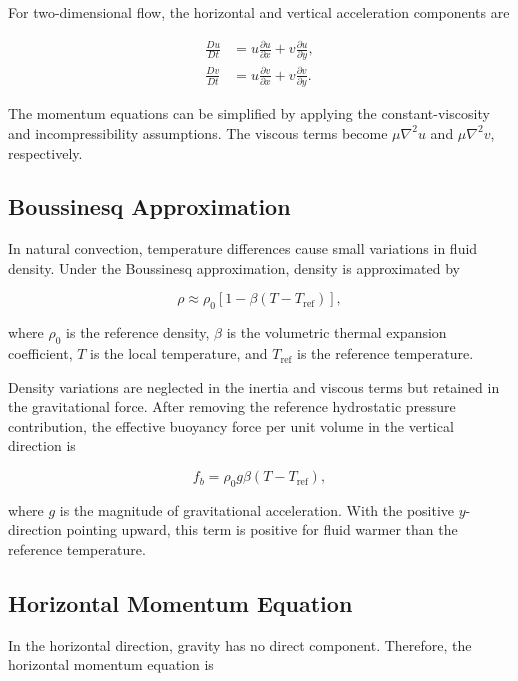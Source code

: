 \documentclass[preprint,3p,number]{elsarticle}
\begin{document}
For two-dimensional flow, the horizontal and vertical
acceleration components are

\begin{align}
\frac{Du}{Dt}
&=u\frac{\partial u}{\partial x}
+v\frac{\partial u}{\partial y},
\\
\frac{Dv}{Dt}
&=u\frac{\partial v}{\partial x}
+v\frac{\partial v}{\partial y}.
\end{align}

The momentum equations can be simplified by applying the
constant-viscosity and incompressibility assumptions. The
viscous terms become $\mu\nabla^2u$ and $\mu\nabla^2v$,
respectively.

\subsection{Boussinesq Approximation}

In natural convection, temperature differences cause small
variations in fluid density. Under the Boussinesq approximation,
density is approximated by

\begin{equation}
\rho\approx\rho_0
\left[1-\beta(T-T_{\mathrm{ref}})\right],
\label{eq:density}
\end{equation}

where $\rho_0$ is the reference density, $\beta$ is the
volumetric thermal expansion coefficient, $T$ is the local
temperature, and $T_{\mathrm{ref}}$ is the reference
temperature.

Density variations are neglected in the inertia and viscous
terms but retained in the gravitational force. After removing
the reference hydrostatic pressure contribution, the effective
buoyancy force per unit volume in the vertical direction is

\begin{equation}
f_b=\rho_0g\beta(T-T_{\mathrm{ref}}),
\label{eq:buoyancy}
\end{equation}

where $g$ is the magnitude of gravitational acceleration.
With the positive $y$-direction pointing upward, this term
is positive for fluid warmer than the reference temperature.

\subsection{Horizontal Momentum Equation}

In the horizontal direction, gravity has no direct component.
Therefore, the horizontal momentum equation is
\end{document}
